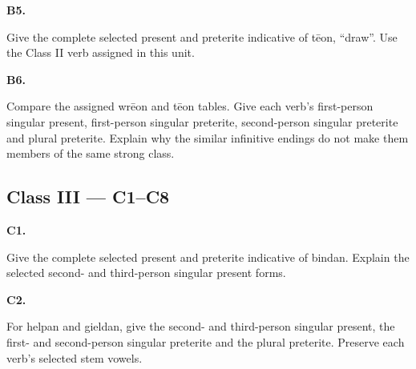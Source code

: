 \par\begin{minipage}{\linewidth}\raggedright
\textbf{B5.}

Give the complete selected present and preterite indicative of tēon, “draw”. Use the Class II verb assigned in this unit.

\end{minipage}\par\addvspace{4pt}

\par\begin{minipage}{\linewidth}\raggedright
\textbf{B6.}

Compare the assigned wrēon and tēon tables. Give each verb’s first-person singular present, first-person singular preterite, second-person singular preterite and plural preterite. Explain why the similar infinitive endings do not make them members of the same strong class.

\end{minipage}\par\addvspace{4pt}

\subsection*{Class III — C1–C8}

\par\begin{minipage}{\linewidth}\raggedright
\textbf{C1.}

Give the complete selected present and preterite indicative of bindan. Explain the selected second- and third-person singular present forms.

\end{minipage}\par\addvspace{4pt}

\par\begin{minipage}{\linewidth}\raggedright
\textbf{C2.}

For helpan and gieldan, give the second- and third-person singular present, the first- and second-person singular preterite and the plural preterite. Preserve each verb’s selected stem vowels.

\end{minipage}\par\addvspace{4pt}

